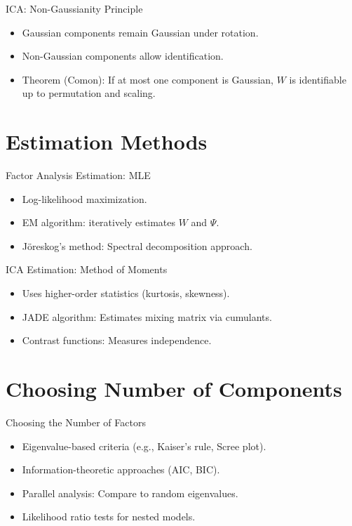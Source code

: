 \documentclass[11pt,handout,aspectratio=169]{beamer}
\begin{document}
\begin{frame}{ICA: Non-Gaussianity Principle}
    \begin{itemize}
        \item Gaussian components remain Gaussian under rotation.
        \item Non-Gaussian components allow identification.
        \item Theorem (Comon): If at most one component is Gaussian, $W$ is identifiable up to permutation and scaling.
    \end{itemize}
\end{frame}

\section{Estimation Methods}

\begin{frame}{Factor Analysis Estimation: MLE}
    \begin{itemize}
        \item Log-likelihood maximization.
        \item EM algorithm: iteratively estimates $W$ and $\Psi$.
        \item J\"oreskog's method: Spectral decomposition approach.
    \end{itemize}
\end{frame}

\begin{frame}{ICA Estimation: Method of Moments}
    \begin{itemize}
        \item Uses higher-order statistics (kurtosis, skewness).
        \item JADE algorithm: Estimates mixing matrix via cumulants.
        \item Contrast functions: Measures independence.
    \end{itemize}
\end{frame}

\section{Choosing Number of Components}

\begin{frame}{Choosing the Number of Factors}
    \begin{itemize}
        \item Eigenvalue-based criteria (e.g., Kaiser's rule, Scree plot).
        \item Information-theoretic approaches (AIC, BIC).
        \item Parallel analysis: Compare to random eigenvalues.
        \item Likelihood ratio tests for nested models.
    \end{itemize}
\end{frame}
\end{document}
